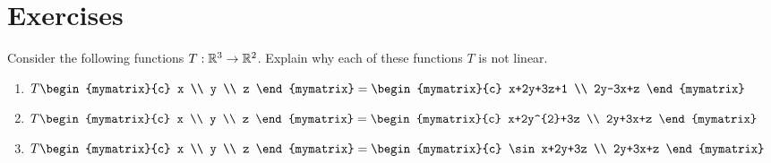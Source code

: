 \section*{Exercises}

\begin{ex}
  Consider the following functions $T:\mathbb{R}^{3}\rightarrow \mathbb{R}^{2}$.
  Explain why each of these functions $T$ is not linear.

  \begin{enumerate}
  \item $T\begin{mymatrix}{c}
      x \\
      y \\
      z
    \end{mymatrix} =\begin{mymatrix}{c}
      x+2y+3z+1 \\
      2y-3x+z
    \end{mymatrix} $

  \item $T\begin{mymatrix}{c}
      x \\
      y \\
      z
    \end{mymatrix} =\begin{mymatrix}{c}
      x+2y^{2}+3z \\
      2y+3x+z
    \end{mymatrix} $

  \item $T\begin{mymatrix}{c}
      x \\
      y \\
      z
    \end{mymatrix} =\begin{mymatrix}{c}
      \sin x+2y+3z \\
      2y+3x+z
    \end{mymatrix} $
  \end{enumerate}
\end{ex}

